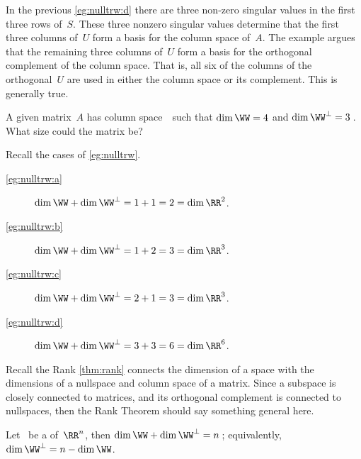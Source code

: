 In the previous \autoref{eg:nulltrw:d} there are three non-zero singular values in the first three rows of~\(S\).
These three nonzero singular values determine that the first three columns of~\(U\) form a basis for the column space of~\(A\).
The example argues that the remaining three columns of~\(U\) form a basis for the orthogonal complement of the column space.
That is, all six of the columns of the orthogonal~\(U\) are used in either the column space or its complement.
This is generally true.

\begin{activity}
A given matrix~\(A\) has column space~\WW\ such that \(\dim\WW=4\) and \(\dim\WW^\perp=3\)\,.  
What size could the matrix be?
\end{activity}



\begin{example} \label{eg:orthrank}
Recall the cases of \autoref{eg:nulltrw}.
\begin{description}
\item[\ref{eg:nulltrw:a}] \(\dim\WW+\dim\WW^\perp=1+1=2=\dim\RR^2\).
\item[\ref{eg:nulltrw:b}] \(\dim\WW+\dim\WW^\perp=1+2=3=\dim\RR^3\).
\item[\ref{eg:nulltrw:c}] \(\dim\WW+\dim\WW^\perp=2+1=3=\dim\RR^3\).
\item[\ref{eg:nulltrw:d}] \(\dim\WW+\dim\WW^\perp=3+3=6=\dim\RR^6\).
\end{description}
\end{example}

Recall the Rank \autoref{thm:rank} connects the  dimension of a space with the dimensions of a nullspace and column space of a matrix.
Since a subspace is closely connected to matrices, and its orthogonal complement is connected to nullspaces, then the Rank Theorem should say something general here.



\begin{theorem} \label{thm:orthrank}
Let \WW\ be a  of~\(\RR^n\), then \(\dim\WW+\dim\WW^\perp=n\)\,; equivalently, \(\dim\WW^\perp=n-\dim\WW\).
\end{theorem}

